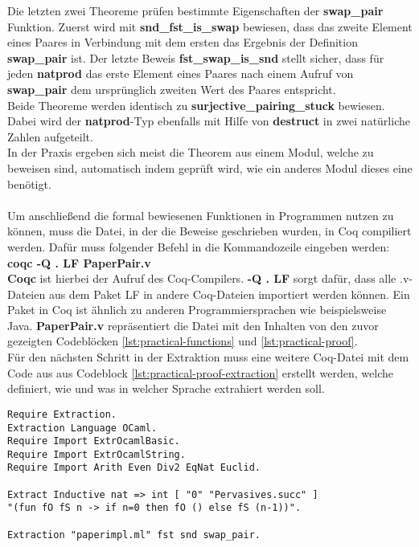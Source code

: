 Die letzten zwei Theoreme prüfen bestimmte Eigenschaften der \textbf{swap\_pair} Funktion. Zuerst wird mit \textbf{snd\_fst\_is\_swap} bewiesen, dass das zweite Element eines Paares in Verbindung mit dem ersten das Ergebnis der Definition \textbf{swap\_pair} ist. Der letzte Beweis \textbf{fst\_swap\_is\_snd} stellt sicher, dass für jeden \textbf{natprod} das erste Element eines Paares nach einem Aufruf von \textbf{swap\_pair} dem ursprünglich zweiten Wert des Paares entspricht.\\
Beide Theoreme werden identisch zu \textbf{surjective\_pairing\_stuck} bewiesen. Dabei wird der \textbf{natprod}-Typ ebenfalls mit Hilfe von \textbf{destruct} in zwei natürliche Zahlen aufgeteilt.\\
In der Praxis ergeben sich meist die Theorem aus einem Modul, welche zu beweisen sind, automatisch indem geprüft wird, wie ein anderes Modul dieses eine benötigt.\\
\\
Um anschließend die formal bewiesenen Funktionen in Programmen nutzen zu können, muss die Datei, in der die Beweise geschrieben wurden, in Coq compiliert werden. Dafür muss folgender Befehl in die Kommandozeile eingeben werden:\\
\textbf{coqc -Q . LF PaperPair.v} \\
\textbf{Coqc} ist hierbei der Aufruf des Coq-Compilers. \textbf{-Q . LF} sorgt dafür, dass alle .v-Dateien aus dem Paket LF in andere Coq-Dateien importiert werden können. Ein Paket in Coq ist ähnlich zu anderen Programmiersprachen wie beispielsweise Java. \textbf{PaperPair.v} repräsentiert die Datei mit den Inhalten von den zuvor gezeigten Codeblöcken \ref{lst:practical-functions} und \ref{lst:practical-proof}.
\\
Für den nächsten Schritt in der Extraktion muss eine weitere Coq-Datei mit dem Code aus aus Codeblock \ref{lst:practical-proof-extraction} erstellt werden, welche definiert, wie und was in welcher Sprache extrahiert werden soll.
\begin{lstlisting}[language=coq,firstnumber=1,caption=Coq Code extrahieren (PaperPairExtraction.v),label=lst:practical-proof-extraction]
Require Extraction.
Extraction Language OCaml.
Require Import ExtrOcamlBasic.
Require Import ExtrOcamlString.
Require Import Arith Even Div2 EqNat Euclid.

Extract Inductive nat => int [ "0" "Pervasives.succ" ]
"(fun fO fS n -> if n=0 then fO () else fS (n-1))".

Extraction "paperimpl.ml" fst snd swap_pair.
\end{lstlisting}

